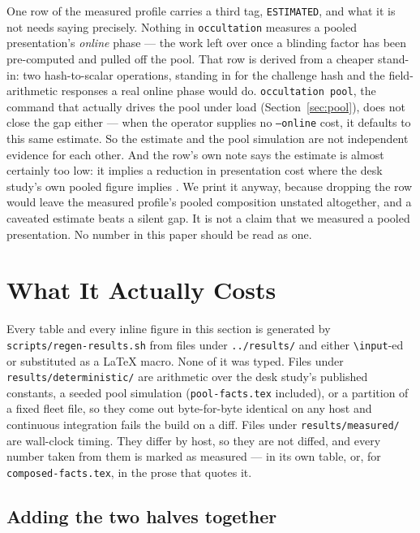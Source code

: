 \documentclass[11pt]{article}
\newcommand{\occultation}{\texttt{occultation}}
\begin{document}
One row of the measured profile carries a third tag, \texttt{ESTIMATED}, and
what it is not needs saying precisely. Nothing in \occultation{} measures a
pooled presentation's \emph{online} phase --- the work left over once a
blinding factor has been pre-computed and pulled off the pool. That row is
derived from a cheaper stand-in: two hash-to-scalar operations, standing in
for the challenge hash and the field-arithmetic responses a real online phase
would do. \texttt{occultation pool}, the command that actually drives the
pool under load (Section~\ref{sec:pool}), does not close the gap either ---
when the operator supplies no \texttt{--online} cost, it defaults to this
same estimate. So the estimate and the pool simulation are not independent
evidence for each other. And the row's own note says the estimate is almost
certainly too low: it implies a \pooledreductionpct{} reduction in
presentation cost where the desk study's own pooled figure implies
\deskpooledreductionpct{}. We print it anyway, because dropping the row would
leave the measured profile's pooled composition unstated altogether, and a
caveated estimate beats a silent gap. It is not a claim that we measured a
pooled presentation. No number in this paper should be read as one.

\section{What It Actually Costs}
\label{sec:results}

Every table and every inline figure in this section is generated by
\texttt{scripts/\allowbreak regen-results.sh} from files under
\texttt{../results/} and either \texttt{\textbackslash{}input}-ed or
substituted as a \LaTeX{} macro. None of it was typed. Files under
\texttt{results/deterministic/} are arithmetic over the desk study's
published constants, a seeded pool simulation (\texttt{pool-facts.tex}
included), or a partition of a fixed fleet file, so they come out
byte-for-byte identical on any host and continuous integration fails the
build on a diff. Files under \texttt{results/measured/} are wall-clock
timing. They differ by host, so they are not diffed, and every number taken
from them is marked as measured --- in its own table, or, for
\texttt{composed-facts.tex}, in the prose that quotes it.

\subsection{Adding the two halves together}
\label{sec:results-composed}
\end{document}
